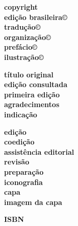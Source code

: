 \newcommand{\linha}[2]{\ifdef{#2}{\linhalayout{#1}{#2}}{}}

\begingroup\tiny
\parindent=0cm
\thispagestyle{empty}

\textbf{copyright}\\
\textbf{edição brasileira©}\\
\textbf{tradução©}\\
\textbf{organização©}\\
\textbf{prefácio©}\\
\textbf{ilustração©}\medskip

\textbf{título original}\\
\textbf{edição consultada}\\
\textbf{primeira edição}\\
\textbf{agradecimentos}\\
\textbf{indicação}\medskip

\textbf{edição}\\
\textbf{coedição}\\
\textbf{assistência editorial}\\
\textbf{revisão}\\
\textbf{preparação}\\
\textbf{iconografia}\\
\textbf{capa}\\
\textbf{imagem da capa}\medskip

\textbf{ISBN}\smallskip

 

